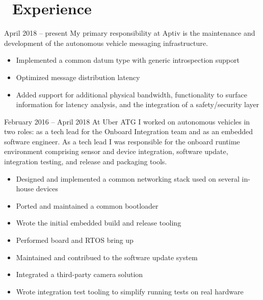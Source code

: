 \documentclass{resume}
\begin{document}


 
\section{\faWrench\ Experience}
          {April 2018 -- present}
My primary responsibility at Aptiv is the maintenance and development of the autonomous vehicle
messaging infrastructure.
\begin{itemize}
  \item Implemented a common datum type with generic introspection support
  \item Optimized message distribution latency
  \item Added support for additional physical bandwidth, functionality to surface information for
        latency analysis, and the integration of a safety/security layer
\end{itemize}
\vspace{3mm}

          {February 2016 -- April 2018}
At Uber ATG I worked on autonomous vehicles in two roles: as a tech lead for the Onboard Integration team and
as an embedded software engineer.  As a tech lead I was responsible for the onboard runtime
environment comprising sensor and device integration, software update, integration testing, and
release and packaging tools.
\begin{itemize}
  \item Designed and implemented a common networking stack used on several in-house devices
  \item Ported and maintained a common bootloader
  \item Wrote the initial embedded build and release tooling
  \item Performed board and RTOS bring up
  \item Maintained and contribued to the software update system
  \item Integrated a third-party camera solution
  \item Wrote integration test tooling to simplify running tests on real hardware
\end{itemize}
\vspace{3mm}
\end{document}
